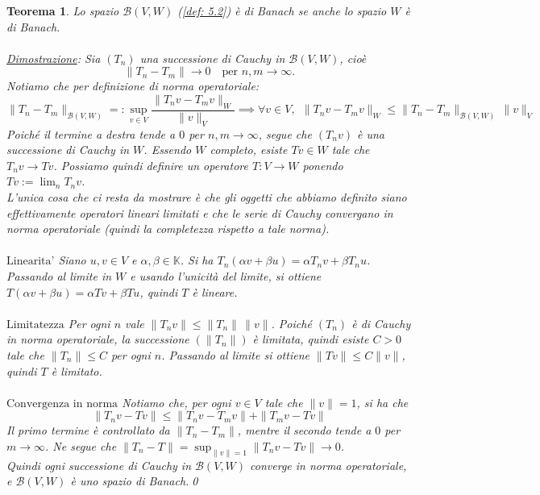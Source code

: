 \documentclass[a4paper,12pt]{report}
\newtheorem{teorema}{Teorema}[chapter]
\begin{document}
\begin{teorema}
    Lo spazio $\mathcal{B}(V, W)$ (\ref{def: 5.2}) è di Banach se anche lo spazio $W$ è di Banach.
    \\
    \\\underline{Dimostrazione}: Sia $(T_n)$ una successione di Cauchy in $\mathcal B(V,W)$, cioè
    \[
    \|T_n - T_m\| \to 0 \quad \text{per } n,m \to \infty.
    \]
    Notiamo che per definizione di norma operatoriale:
    \[
    \|T_n-T_m\|_{\mathcal{B}(V,W)}=:\sup_{v\in V}\frac{\|T_nv-T_mv\|_W}{\|v\|_V}\implies \forall v\in V , \ \ \|T_n v - T_m v\|_W
    \le \|T_n - T_m\|_{\mathcal{B}(V,W)}\,\|v\|_V
    \]
    Poiché il termine a destra tende a $0$ per $n,m \to \infty$, segue che $(T_n v)$ è una successione di Cauchy in $W$. Essendo $W$ completo, esiste $Tv \in W$ tale che $T_n v \to Tv$.
    Possiamo quindi definire un operatore $T:V \to W$ ponendo $Tv := \lim_n T_n v$.
    \\L'unica cosa che ci resta da mostrare è che gli oggetti che abbiamo definito siano effettivamente operatori lineari limitati e che le serie di Cauchy convergano in norma operatoriale (quindi la completezza   rispetto a tale norma).
    \\
    \\ $\boxed{\text{Linearita'}}$ Siano $u,v \in V$ e $\alpha,\beta \in \mathbb{K}$. Si ha $T_n(\alpha v + \beta u) = \alpha T_n v + \beta T_n u$. Passando al limite in $W$ e usando l’unicità del limite, si ottiene $T(\alpha v + \beta u) = \alpha Tv + \beta Tu$, quindi $T$ è lineare.
    \\
    \\$\boxed{\text{Limitatezza}}$ Per ogni $n$ vale $\|T_n v\| \le \|T_n\|\,\|v\|$. Poiché $(T_n)$ è di Cauchy in norma operatoriale, la successione $(\|T_n\|)$ è limitata, quindi esiste $C>0$ tale che $\|T_n\| \le C$ per ogni $n$. Passando al limite si ottiene $\|Tv\| \le C \|v\|$, quindi $T$ è limitato.
    \\
    \\$\boxed{\text{Convergenza in norma}}$ Notiamo che, per ogni  $v \in V$ tale che $\|v\|=1$, si ha che 
    \[\|T_n v - Tv\|\le \|T_n v - T_m v\| + \|T_m v - Tv\|\]
    Il primo termine è controllato da $\|T_n - T_m\|$, mentre il secondo tende a $0$ per $m \to \infty$. Ne segue che $\|T_n - T\| = \sup_{\|v\|=1} \|T_n v - Tv\| \to 0$.
    \\Quindi ogni successione di Cauchy in $\mathcal B(V,W)$ converge in norma operatoriale, e $\mathcal B(V,W)$ è uno spazio di Banach.\qed
\end{teorema}
\end{document}
